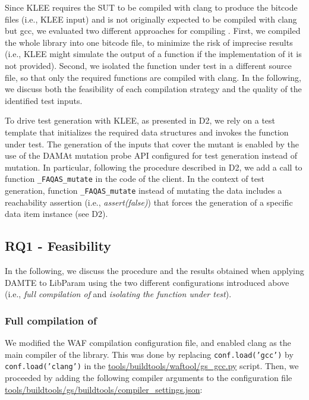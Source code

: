 Since KLEE requires the SUT to be compiled with clang to produce the bitcode files (i.e., KLEE input) and \PARAM is not originally expected to be compiled with clang but gcc,
we evaluated two different approaches for compiling \PARAM. First, we compiled the whole library into one bitcode file, to minimize the risk of imprecise results (i.e., KLEE might simulate the output of a function if the implementation of it is not provided). Second, we isolated the function under test in a different source file, so that only the required functions are compiled with clang. In the following, we discuss both the feasibility of each compilation strategy and the quality of the identified test inputs.

To drive test generation with KLEE, as presented in D2, we rely on a test template that initializes the required data structures and invokes the function under test.
The generation of the inputs that cover the mutant is enabled by the use of the DAMAt mutation probe API configured for test generation instead of mutation.
In particular, following the procedure described in D2, we add a call to function \texttt{\_FAQAS\_mutate} in the code of the \PARAM client. In the context of test generation, function \texttt{\_FAQAS\_mutate} instead of mutating the data includes a reachability assertion (i.e., \emph{assert(false)}) that forces the generation of a specific data item instance (see D2).

\subsection{RQ1 - Feasibility}



In the following, we discuss the procedure and the results obtained when applying DAMTE to LibParam using the two different configurations introduced above  (i.e., \emph{full compilation of \PARAM} and \emph{isolating the function under test}).

\subsubsection{Full compilation of \PARAM}

We modified the WAF compilation configuration file, and enabled clang as the main compiler of the library. This was done by replacing \texttt{conf.load('gcc')} by \texttt{conf.load('clang')} in the \url{tools/buildtools/waftool/gs_gcc.py} script.
Then, we proceeded by adding the following compiler arguments to the configuration file \url{tools/buildtools/gs/buildtools/compiler_settings.json}:


